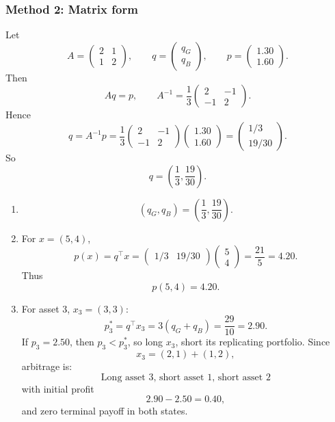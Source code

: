 \documentclass[12pt]{article}
\begin{document}
\newpage
\subsubsection*{Method 2: Matrix form}

Let
\[
A=
\begin{pmatrix}
2&1\\
1&2
\end{pmatrix},\qquad
q=
\begin{pmatrix}
q_G\\ q_B
\end{pmatrix},\qquad
p=
\begin{pmatrix}
1.30\\ 1.60
\end{pmatrix}.
\]
Then
\[
Aq=p,\qquad
A^{-1}=\frac1{3}
\begin{pmatrix}
2&-1\\
-1&2
\end{pmatrix}.
\]
Hence
\[
q=A^{-1}p
=\frac1{3}
\begin{pmatrix}
2&-1\\
-1&2
\end{pmatrix}
\begin{pmatrix}
1.30\\1.60
\end{pmatrix}
=
\begin{pmatrix}
1/3\\19/30
\end{pmatrix}.
\]
So
\[
\boxed{q=\left(\frac13,\frac{19}{30}\right).}
\]

\begin{enumerate}[label=(\alph*)]
\item \[
\boxed{(q_G,q_B)=\left(\frac13,\frac{19}{30}\right).}
\]

\item For \(x=(5,4)\),
\[
p(x)=q^\top x
=
\begin{pmatrix}
1/3 & 19/30
\end{pmatrix}
\begin{pmatrix}
5\\4
\end{pmatrix}
=\frac{21}{5}=4.20.
\]
Thus
\[
\boxed{p(5,4)=4.20.}
\]

\item For asset 3, \(x_3=(3,3)\):
\[
p_3^*=q^\top x_3=3(q_G+q_B)=\frac{29}{10}=2.90.
\]
If \(p_3=2.50\), then \(p_3<p_3^*\), so long \(x_3\), short its replicating portfolio. Since
\[
x_3=(2,1)+(1,2),
\]
arbitrage is:
\[
\text{Long asset 3,\ \ short asset 1,\ \ short asset 2}
\]
with initial profit
\[
2.90-2.50=\boxed{0.40},
\]
and zero terminal payoff in both states.
\end{enumerate}
\end{document}
